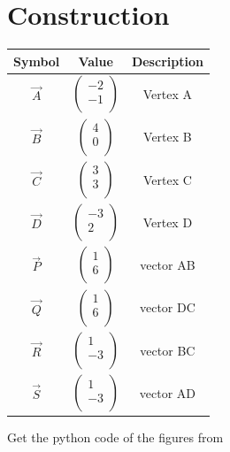 \documentclass[journal,12pt,twocolumn]{IEEEtran}
\begin{document}
\section*{Construction}
\centering
\vspace{0.2cm}
{
\setlength\extrarowheight{2pt}
\begin{tabular}{|c|c|c|}
	\hline
	\textbf{Symbol}&\textbf{Value}&\textbf{Description}\\
	\hline
	$\vec{A}$ & $\begin{pmatrix}-2 \\ -1 \\ \end{pmatrix}$ & Vertex A\\
	\hline
	$\vec{B}$ & $\begin{pmatrix}4 \\ 0 \\ \end{pmatrix}$ & Vertex B\\
	\hline
	$\vec{C}$& $\begin{pmatrix}3 \\ 3 \\ \end{pmatrix}$ & Vertex C\\
	\hline
	$\vec{D}$ & $\begin{pmatrix}-3 \\ 2 \\ \end{pmatrix}$ & Vertex D\\
	\hline
	$\vec{P}$ &$\begin{pmatrix}1 \\ 6 \\ \end{pmatrix}$&vector AB\\
	\hline
	$\vec{Q}$ &$\begin{pmatrix}1 \\ 6 \\ \end{pmatrix}$&vector DC\\
	\hline
	$\vec{R}$ &$\begin{pmatrix}1 \\ -3 \\ \end{pmatrix}$&vector BC\\
	\hline
	$\vec{S}$ &$\begin{pmatrix}1 \\ -3 \\ \end{pmatrix}$&vector AD\\
	\hline
\end{tabular}
}

\vspace{0.6cm}
Get the python code of the figures from
\begin{table}[h]
\large
\centering
{}


\end{table}
\end{document}
